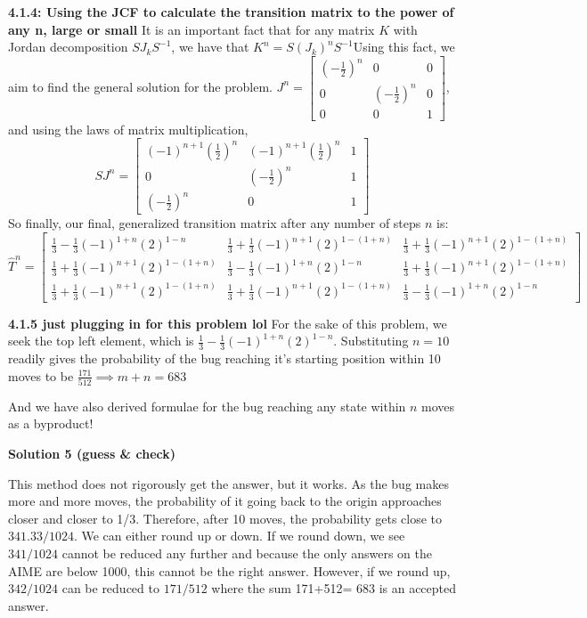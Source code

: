 \begin{enumerate}
 \textbf{4.1.4: Using the JCF to calculate the transition matrix to the power of any n, large or small} It is an important fact that for any matrix $K$ with Jordan decomposition $SJ_kS^{-1}$, we have that $K^n = S(J_k)^nS^{-1}$Using this fact, we aim to find the general solution for the problem. $J^n = \begin{bmatrix} \left(-\frac{1}{2}\right)^n & 0 & 0\\ 0 & \left(-\frac{1}{2}\right)^n & 0\\ 0 & 0 & 1 \end{bmatrix}$, and using the laws of matrix multiplication, 
 \[SJ^n = \begin{bmatrix} (-1)^{n+1}\left(\frac{1}{2}\right)^n & (-1)^{n+1}\left(\frac{1}{2}\right)^n & 1\\ 0 & \left(-\frac{1}{2}\right)^n & 1\\ \left(-\frac{1}{2}\right)^n & 0 & 1 \end{bmatrix}\]So finally, our final, generalized transition matrix after any number of steps $n$ is:
 \[\hat{T}^n = \begin{bmatrix} \frac{1}{3} - \frac{1}{3}(-1)^{1+n}(2)^{1-n} & \frac{1}{3} + \frac{1}{3}(-1)^{n+1}(2)^{1-(1+n)} & \frac{1}{3} + \frac{1}{3}(-1)^{n+1}(2)^{1-(1+n)}\\ \frac{1}{3} + \frac{1}{3}(-1)^{n+1}(2)^{1-(1+n)} & \frac{1}{3} - \frac{1}{3}(-1)^{1+n}(2)^{1-n} & \frac{1}{3} + \frac{1}{3}(-1)^{n+1}(2)^{1-(1+n)}\\ \frac{1}{3} + \frac{1}{3}(-1)^{n+1}(2)^{1-(1+n)} & \frac{1}{3} + \frac{1}{3}(-1)^{n+1}(2)^{1-(1+n)} & \frac{1}{3} - \frac{1}{3}(-1)^{1+n}(2)^{1-n} \end{bmatrix}\]

 \textbf{4.1.5 just plugging in for this problem lol} For the sake of this problem, we seek the top left element, which is $\frac{1}{3} - \frac{1}{3}(-1)^{1+n}(2)^{1-n}$. Substituting $n=10$ readily gives the probability of the bug reaching it's starting position within 10 moves to be $\frac{171}{512} \implies m+n = \boxed{683}$

 And we have also derived formulae for the bug reaching any state within $n$ moves as a byproduct!

 



\textbf{Solution 5 (guess & check)}

This method does not rigorously get the answer, but it works. As the bug makes more and more moves, the probability of it going back to the origin approaches closer and closer to 1/3. Therefore, after 10 moves, the probability gets close to $341.33/1024$. We can either round up or down. If we round down, we see $341/1024$ cannot be reduced any further and because the only answers on the AIME are below 1000, this cannot be the right answer. However, if we round up, $342/1024$ can be reduced to $171/512$ where the sum 171+512= $\boxed{683}$ is an accepted answer.


\end{enumerate}
